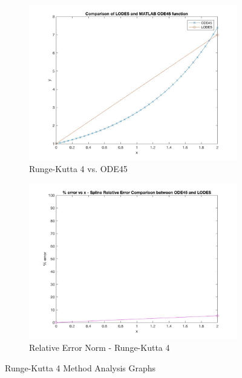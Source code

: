 \documentclass[12pt, titlepage]{article}
\begin{document}
\begin{figure}[H]
\centering
\begin{subfigure}{.55\textwidth}
  \centering
  \includegraphics[width=\linewidth]{images/Test1/4LODESvsMATLABPlot.jpg}
  \caption{Runge-Kutta 4 vs. ODE45}
  \label{fig:rk1a}
\end{subfigure}%
\begin{subfigure}{.55\textwidth}
  \centering
  \includegraphics[width=\linewidth]{images/Test1/4RelativeErrorPlot.jpg}
  \caption{Relative Error Norm - Runge-Kutta 4}
  \label{fig:rk1b}
\end{subfigure}
\caption{Runge-Kutta 4 Method Analysis Graphs}
\label{fig:rk1}
\end{figure}
\end{document}
